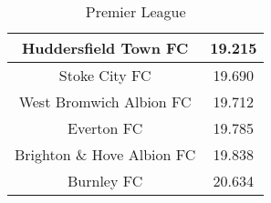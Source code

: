 \documentclass{article}
\begin{document}
\begin{table}[H]
\begin{tabular}{|c|c|}
        Huddersfield Town FC       & 19.215                                    \\ \hline
        Stoke City FC              & 19.690                                    \\ \hline
        West Bromwich Albion FC    & 19.712                                    \\ \hline
        Everton FC                 & 19.785                                    \\ \hline
        Brighton \& Hove Albion FC & 19.838                                    \\ \hline
        Burnley FC                 & 20.634                                    \\ \hline
    \end{tabular}
    \caption{Premier League}
    \label{tab:average_distance_england}
\end{table}
\end{document}
